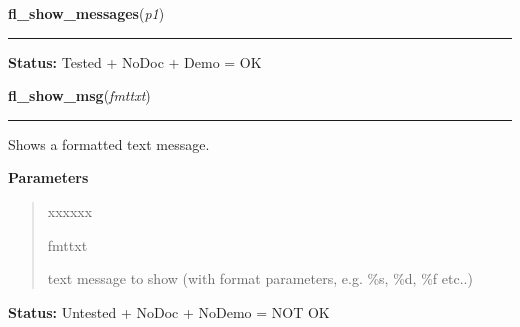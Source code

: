     \label{xformslib:library:fl_show_messages}

    \vspace{0.5ex}

\hspace{.8\funcindent}\begin{boxedminipage}{\funcwidth}

    \raggedright \textbf{fl\_show\_messages}(\textit{p1})

    \vspace{-1.5ex}

    \rule{\textwidth}{0.5\fboxrule}
\setlength{\parskip}{2ex}
\setlength{\parskip}{1ex}
\textbf{Status:} Tested + NoDoc + Demo = OK



    \end{boxedminipage}

    \label{xformslib:library:fl_show_msg}

    \vspace{0.5ex}

\hspace{.8\funcindent}\begin{boxedminipage}{\funcwidth}

    \raggedright \textbf{fl\_show\_msg}(\textit{fmttxt})

    \vspace{-1.5ex}

    \rule{\textwidth}{0.5\fboxrule}
\setlength{\parskip}{2ex}
    Shows a formatted text message.

\setlength{\parskip}{1ex}
      \textbf{Parameters}
      \vspace{-1ex}

      \begin{quote}
        \begin{Ventry}{xxxxxx}

          \item[fmttxt]

          text message to show (with format parameters, e.g. \%s, \%d, \%f 
          etc..)

        \end{Ventry}

      \end{quote}

\textbf{Status:} Untested + NoDoc + NoDemo = NOT OK



    \end{boxedminipage}

